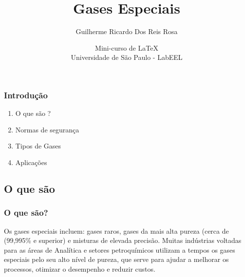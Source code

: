 \documentclass{beamer}
\title[Gases Especiais]{\Huge{Gases Especiais}}
\author[Guilherme Rosa]{Guilherme Ricardo Dos Reis Rosa \\
  \text{\scriptsize{guilhermericardo8@usp.br}}}
\date[EEL-USP]{\scriptsize{Mini-curso de \LaTeX} \\ Universidade de São Paulo - LabEEL}
\begin{document}
{



  \begin{frame}
    \titlepage
  \end{frame}
}


\begin{frame}
  \frametitle{Introdução}

  \begin{enumerate}
  \item<1->[{\textcolor{yellow!90!black}{\ding{254}}}]{O que são ?}
  \item<4->[\ding{58}]{Normas de segurança}
  \item<2->[{\textcolor{red}{\ding{96}}}]{Tipos de Gases}
  \item<3->[{\textcolor{green}{\ding{69}}}]{Aplicações}
  \end{enumerate}

\end{frame}



\begin{frame}

  \section{O que são}
  \frametitle{
    {\textcolor{yellow!70!black}{ {\LARGE {}}} %
      \textcolor{white!100!black}{O que são?}}} %
  \pause
  \begin{tcolorbox}[colback=blue!5!white, colframe=green!65!white,
    title={\sc{\bf{Definição}}}]
    Os \alert{gases especiais} incluem: gases raros, gases da mais alta pureza (cerca de (99,995\% e superior) e misturas de elevada precisão. Muitas indústrias voltadas para as áreas de Analítica e setores petroquímicos utilizam a tempos os gases especiais pelo seu alto nível de pureza, que serve para ajudar a melhorar os processos, otimizar o desempenho e reduzir custos.
  \end{tcolorbox}

\end{frame}
\end{document}
